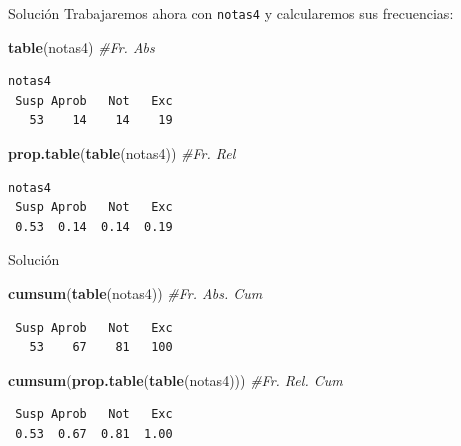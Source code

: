 \documentclass[
  ignorenonframetext,
]{beamer}
\newenvironment{Shaded}{\begin{snugshade}}{\end{snugshade}}
\newcommand{\CommentTok}[1]{\textcolor[rgb]{0.56,0.35,0.01}{\textit{#1}}}
\newcommand{\FunctionTok}[1]{\textcolor[rgb]{0.13,0.29,0.53}{\textbf{#1}}}
\newcommand{\NormalTok}[1]{#1}
\begin{document}
\begin{frame}[fragile]{Solución}
\label{soluciuxf3n-25}
Trabajaremos ahora con \texttt{notas4} y calcularemos sus frecuencias:

\begin{Shaded}
\begin{Highlighting}[]
\FunctionTok{table}\NormalTok{(notas4) }\CommentTok{\#Fr. Abs}
\end{Highlighting}
\end{Shaded}

\begin{verbatim}
notas4
 Susp Aprob   Not   Exc 
   53    14    14    19 
\end{verbatim}

\begin{Shaded}
\begin{Highlighting}[]
\FunctionTok{prop.table}\NormalTok{(}\FunctionTok{table}\NormalTok{(notas4)) }\CommentTok{\#Fr. Rel}
\end{Highlighting}
\end{Shaded}

\begin{verbatim}
notas4
 Susp Aprob   Not   Exc 
 0.53  0.14  0.14  0.19 
\end{verbatim}
\end{frame}

\begin{frame}[fragile]{Solución}
\label{soluciuxf3n-26}
\begin{Shaded}
\begin{Highlighting}[]
\FunctionTok{cumsum}\NormalTok{(}\FunctionTok{table}\NormalTok{(notas4)) }\CommentTok{\#Fr. Abs. Cum}
\end{Highlighting}
\end{Shaded}

\begin{verbatim}
 Susp Aprob   Not   Exc 
   53    67    81   100 
\end{verbatim}

\begin{Shaded}
\begin{Highlighting}[]
\FunctionTok{cumsum}\NormalTok{(}\FunctionTok{prop.table}\NormalTok{(}\FunctionTok{table}\NormalTok{(notas4))) }\CommentTok{\#Fr. Rel. Cum}
\end{Highlighting}
\end{Shaded}

\begin{verbatim}
 Susp Aprob   Not   Exc 
 0.53  0.67  0.81  1.00 
\end{verbatim}
\end{frame}
\end{document}
